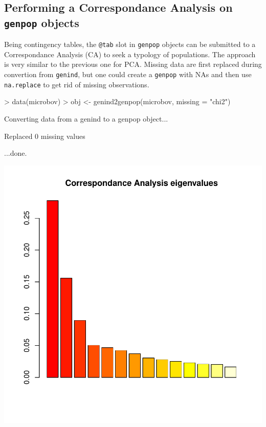 \documentclass{article}
\begin{document}
\subsection{Performing a Correspondance Analysis on \texttt{genpop} objects}
Being contingency tables, the \texttt{@tab} slot in \texttt{genpop} objects can be submitted to a Correspondance Analysis (CA) to seek a typology of populations.
The approach is very similar to the previous one for PCA.
Missing data are first replaced during convertion from \texttt{genind},
but one could create a \texttt{genpop} with NAs and then use
\texttt{na.replace} to get rid of missing observations.
\begin{Schunk}
\begin{Sinput}
> data(microbov)
> obj <- genind2genpop(microbov, missing = "chi2")
\end{Sinput}
\begin{Soutput}
 Converting data from a genind to a genpop object... 

 Replaced 0 missing values 

...done.
\end{Soutput}
\end{Schunk}
\includegraphics{figs/base-caexpl}
\end{document}
